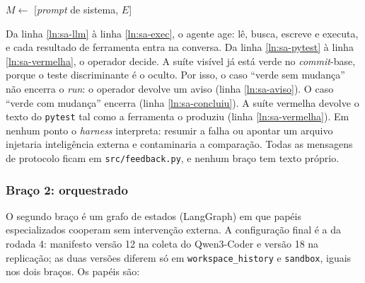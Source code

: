 \begin{algorithm}[ht!]
    \normalem
    $M \leftarrow$ [\textit{prompt} de sistema, $E$]\;
    \;
    \caption{Braço de agente único: laço do agente e política do operador.}
    \label{alg-single}
\end{algorithm}

Da linha \ref{ln:sa-llm} à linha \ref{ln:sa-exec}, o agente age: lê, busca, escreve e executa, e cada resultado de ferramenta entra na conversa. Da linha \ref{ln:sa-pytest} à linha \ref{ln:sa-vermelha}, o operador decide. A suíte visível já está verde no \textit{commit}-base, porque o teste discriminante é o oculto. Por isso, o caso ``verde sem mudança'' não encerra o \textit{run}: o operador devolve um aviso (linha \ref{ln:sa-aviso}). O caso ``verde com mudança'' encerra (linha \ref{ln:sa-concluiu}). A suíte vermelha devolve o texto do \texttt{pytest} tal como a ferramenta o produziu (linha \ref{ln:sa-vermelha}). Em nenhum ponto o \textit{harness} interpreta: resumir a falha ou apontar um arquivo injetaria inteligência externa e contaminaria a comparação. Todas as mensagens de protocolo ficam em \texttt{src/feedback.py}, e nenhum braço tem texto próprio.

\subsubsection{Braço 2: orquestrado}

O segundo braço é um grafo de estados (LangGraph) em que papéis especializados cooperam sem intervenção externa. A configuração final é a da rodada 4: manifesto versão 12 na coleta do Qwen3-Coder e versão 18 na replicação; as duas versões diferem só em \texttt{workspace\_history} e \texttt{sandbox}, iguais nos dois braços. Os papéis são:

